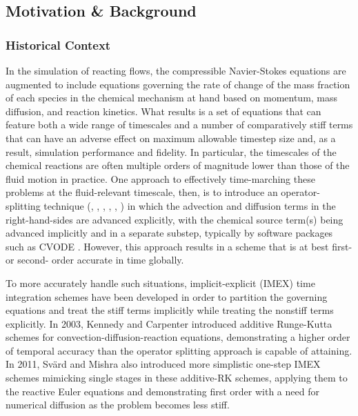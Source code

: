 \subsection{Motivation \& Background}

\subsubsection{Historical Context}

In the simulation of reacting flows, the compressible Navier-Stokes
equations are augmented to include equations governing the rate of
change of the mass fraction of each species in the chemical mechanism
at hand based on momentum, mass diffusion, and reaction kinetics. What
results is a set of equations that can feature both a wide range of
timescales and a number of comparatively stiff terms that can have
an adverse effect on maximum allowable timestep size and, as a result,
simulation performance and fidelity. In particular, the timescales
of the chemical reactions are often multiple orders of magnitude lower
than those of the fluid motion in practice. One approach to effectively
time-marching these problems at the fluid-relevant timescale, then, is
to introduce an operator-splitting technique (\cite{sportisse2000method},
\cite{strang1968construction}, \cite{lapointe2020data}, \cite{macart2016semi},
\cite{ren2008second}, \cite{knio1999semi}) in which the advection
and diffusion terms in the right-hand-sides are advanced explicitly,
with the chemical source term(s) being advanced implicitly and
in a separate substep, typically by software packages such as CVODE \cite{cohen1996cvode}.
However, this approach results in a scheme that is at best
first- or second- order accurate in time globally.

To more accurately handle such situations, implicit-explicit (IMEX) time
integration schemes have been developed in order to partition the
governing equations and treat the stiff terms implicitly while treating
the nonstiff terms explicitly. In 2003, Kennedy and Carpenter \cite{kennedy2003additive}
introduced additive Runge-Kutta schemes for convection-diffusion-reaction equations,
demonstrating a higher order of temporal accuracy than the operator splitting
approach is capable of attaining. In 2011, Sv{\"a}rd and Mishra \cite{svard2011implicit}
also introduced more simplistic one-step IMEX schemes mimicking single stages in these
additive-RK schemes, applying them to the reactive Euler equations and
demonstrating first order with a need for numerical diffusion as the problem
becomes less stiff.

